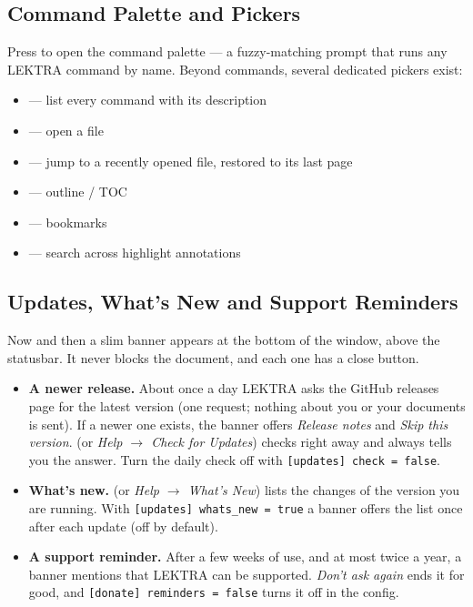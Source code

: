 \documentclass[a4paper,12pt]{article}
\begin{document}
\subsection{Command Palette and Pickers}

Press \keys{:} to open the command palette — a fuzzy-matching prompt that runs any LEKTRA command by name. Beyond commands, several dedicated pickers exist:
\begin{itemize}[leftmargin=*]
    \item {} — list every command with its description
    \item {} — open a file
    \item {} — jump to a recently opened file, restored to its last page
    \item {} — outline / TOC
    \item {} — bookmarks
    \item {} — search across highlight annotations
\end{itemize}

\subsection{Updates, What's New and Support Reminders}

Now and then a slim banner appears at the bottom of the window, above the statusbar. It never blocks the document, and each one has a close button.

\begin{itemize}[leftmargin=*]
    \item \textbf{A newer release.} About once a day LEKTRA asks the GitHub releases page for the latest version (one request; nothing about you or your documents is sent). If a newer one exists, the banner offers \textit{Release notes} and \textit{Skip this version}.  (or \textit{Help $\to$ Check for Updates}) checks right away and always tells you the answer. Turn the daily check off with \texttt{[updates] check = false}.
    \item \textbf{What's new.}  (or \textit{Help $\to$ What's New}) lists the changes of the version you are running. With \texttt{[updates] whats\_\allowbreak{}new = true} a banner offers the list once after each update (off by default).
    \item \textbf{A support reminder.} After a few weeks of use, and at most twice a year, a banner mentions that LEKTRA can be supported. \textit{Don't ask again} ends it for good, and \texttt{[donate] reminders = false} turns it off in the config.
\end{itemize}
\end{document}
